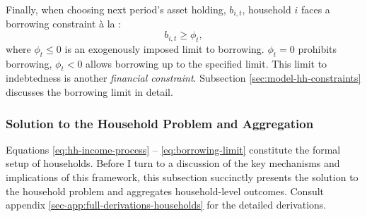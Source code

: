 \documentclass[12pt]{article} %
\numberwithin{equation}{section} %
\begin{document}
Finally, when choosing next period's asset holding, $b_{i,t}$, household $i$ faces a borrowing constraint à la \textcite{huggett1993}:
\begin{equation}
    b_{i,t} \ge \phi_t, \label{eq:borrowing-limit}
\end{equation}
where $\phi_t \le 0$ is an exogenously imposed limit to borrowing. $\phi_t = 0$ prohibits borrowing, $\phi_t < 0$ allows borrowing up to the specified limit. This limit to indebtedness is another \textit{financial constraint}. Subsection \ref{sec:model-hh-constraints} discusses the borrowing limit in detail.


\subsubsection{Solution to the Household Problem and Aggregation}
\label{sec:model-hh-solution}

Equations \eqref{eq:hh-income-process} -- \eqref{eq:borrowing-limit} constitute the formal setup of households. Before I turn to a discussion of the key mechanisms and implications of this framework, this subsection succinctly presents the solution to the household problem and aggregates household-level outcomes. Consult appendix \ref{sec-app:full-derivations-households} for the detailed derivations.
\end{document}
